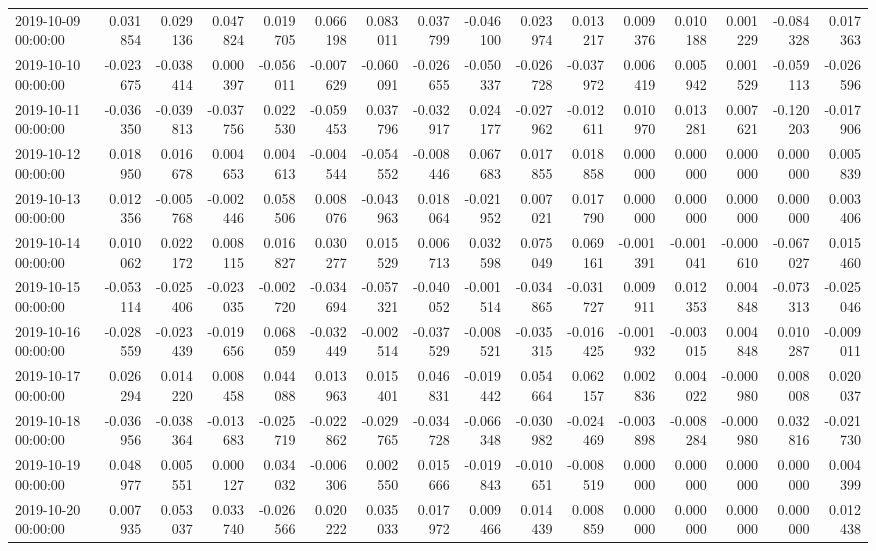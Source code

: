 \begin{tabular}{lrrrrrrrrrrrrrrr}
2019-10-09 00:00:00 & 0.031854 & 0.029136 & 0.047824 & 0.019705 & 0.066198 & 0.083011 & 0.037799 & -0.046100 & 0.023974 & 0.013217 & 0.009376 & 0.010188 & 0.001229 & -0.084328 & 0.017363 \\
2019-10-10 00:00:00 & -0.023675 & -0.038414 & 0.000397 & -0.056011 & -0.007629 & -0.060091 & -0.026655 & -0.050337 & -0.026728 & -0.037972 & 0.006419 & 0.005942 & 0.001529 & -0.059113 & -0.026596 \\
2019-10-11 00:00:00 & -0.036350 & -0.039813 & -0.037756 & 0.022530 & -0.059453 & 0.037796 & -0.032917 & 0.024177 & -0.027962 & -0.012611 & 0.010970 & 0.013281 & 0.007621 & -0.120203 & -0.017906 \\
2019-10-12 00:00:00 & 0.018950 & 0.016678 & 0.004653 & 0.004613 & -0.004544 & -0.054552 & -0.008446 & 0.067683 & 0.017855 & 0.018858 & 0.000000 & 0.000000 & 0.000000 & 0.000000 & 0.005839 \\
2019-10-13 00:00:00 & 0.012356 & -0.005768 & -0.002446 & 0.058506 & 0.008076 & -0.043963 & 0.018064 & -0.021952 & 0.007021 & 0.017790 & 0.000000 & 0.000000 & 0.000000 & 0.000000 & 0.003406 \\
2019-10-14 00:00:00 & 0.010062 & 0.022172 & 0.008115 & 0.016827 & 0.030277 & 0.015529 & 0.006713 & 0.032598 & 0.075049 & 0.069161 & -0.001391 & -0.001041 & -0.000610 & -0.067027 & 0.015460 \\
2019-10-15 00:00:00 & -0.053114 & -0.025406 & -0.023035 & -0.002720 & -0.034694 & -0.057321 & -0.040052 & -0.001514 & -0.034865 & -0.031727 & 0.009911 & 0.012353 & 0.004848 & -0.073313 & -0.025046 \\
2019-10-16 00:00:00 & -0.028559 & -0.023439 & -0.019656 & 0.068059 & -0.032449 & -0.002514 & -0.037529 & -0.008521 & -0.035315 & -0.016425 & -0.001932 & -0.003015 & 0.004848 & 0.010287 & -0.009011 \\
2019-10-17 00:00:00 & 0.026294 & 0.014220 & 0.008458 & 0.044088 & 0.013963 & 0.015401 & 0.046831 & -0.019442 & 0.054664 & 0.062157 & 0.002836 & 0.004022 & -0.000980 & 0.008008 & 0.020037 \\
2019-10-18 00:00:00 & -0.036956 & -0.038364 & -0.013683 & -0.025719 & -0.022862 & -0.029765 & -0.034728 & -0.066348 & -0.030982 & -0.024469 & -0.003898 & -0.008284 & -0.000980 & 0.032816 & -0.021730 \\
2019-10-19 00:00:00 & 0.048977 & 0.005551 & 0.000127 & 0.034032 & -0.006306 & 0.002550 & 0.015666 & -0.019843 & -0.010651 & -0.008519 & 0.000000 & 0.000000 & 0.000000 & 0.000000 & 0.004399 \\
2019-10-20 00:00:00 & 0.007935 & 0.053037 & 0.033740 & -0.026566 & 0.020222 & 0.035033 & 0.017972 & 0.009466 & 0.014439 & 0.008859 & 0.000000 & 0.000000 & 0.000000 & 0.000000 & 0.012438 \\

\end{tabular}

